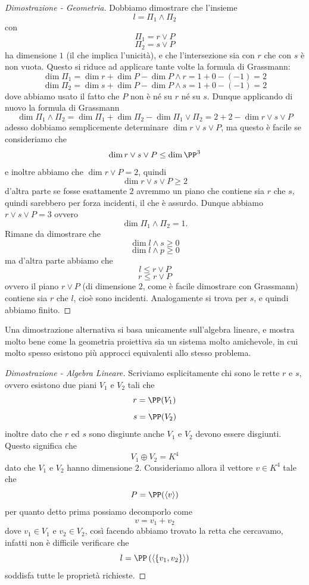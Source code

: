\documentclass[11pt]{scrartcl}
\begin{document}
   	 \begin{proof}[Dimostrazione - Geometria]
   	 	Dobbiamo dimostrare che l'insieme
   	 	$$l=\Pi_1\land \Pi_2$$
   	 	con 
   	 	$$\Pi_1=r\lor P$$
   	 	$$\Pi_2=s\lor P$$
   	 	ha dimensione $1$ (il che implica l'unicità), e che l'intersezione sia con $r$ che con $s$ è non vuota. Questo si riduce ad applicare tante volte la formula di Grassmann:
   	 	$$\dim \Pi_1=\dim r + \dim P - \dim P\land r=1+0-(-1)=2$$
   	 	$$\dim \Pi_2=\dim s + \dim P - \dim P\land s=1+0-(-1)=2$$
   	 	dove abbiamo usato il fatto che $P$ non è né su $r$ né su $s$. Dunque applicando di nuovo la formula di Grassmann
   	 	$$\dim \Pi_1\land \Pi_2=\dim \Pi_1+\dim \Pi_2-\dim \Pi_1\lor \Pi_2=2+2-\dim r\lor s\lor P$$
   	 	adesso dobbiamo semplicemente determinare $\dim r\lor s \lor P$, ma questo è facile se consideriamo che
   	 	$$\dim r\lor s \lor P \le \dim \PP^3$$
   	 	e inoltre abbiamo che $\dim r \lor P=2$, quindi 
   	 	$$\dim r \lor s \lor P\ge 2$$
   	 	d'altra parte se fosse esattamente $2$ avremmo un piano che contiene sia $r$ che $s$, quindi sarebbero per forza incidenti, il che è assurdo. Dunque abbiamo $r\lor s\lor P=3$ ovvero
   	 	$$\dim \Pi_1\land \Pi_2=1.$$
   	 	Rimane da dimostrare che 
   	 	$$\dim l \land s\ge 0$$
   	 	$$\dim l \land p\ge 0$$
   	 	ma d'altra parte abbiamo che
   	 	$$l\le r\lor P$$
   	 	$$r\le r\lor P$$
   	 	ovvero il piano $r\lor P$ (di dimensione $2$, come è facile dimostrare con Grassmann) contiene sia $r$ che $l$, cioè sono incidenti. Analogamente si trova per $s$, e quindi abbiamo finito.
   	 \end{proof}
   	 Una dimostrazione alternativa si basa unicamente sull'algebra lineare, e mostra molto bene come la geometria proiettiva sia un sistema molto amichevole, in cui molto spesso esistono più approcci equivalenti allo stesso problema.
   	 \begin{proof}[Dimostrazione - Algebra Lineare]
   	 	Scriviamo esplicitamente chi sono le rette $r$ e $s$, ovvero esistono due piani $V_1$ e $V_2$ tali che
   	 	$$r=\PP(V_1)$$
   	 	$$s=\PP(V_2)$$
   	 	inoltre dato che $r$ ed $s$ sono disgiunte anche $V_1$ e $V_2$ devono essere disgiunti. Questo significa che 
   	 	$$V_1\oplus V_2 = K^4$$
   	 	dato che $V_1$ e $V_2$ hanno dimensione $2$. Consideriamo allora il vettore $v\in K^4$ tale che
   	 	$$P=\PP(\langle v \rangle)$$
   	 	per quanto detto prima possiamo decomporlo come
   	 	$$v=v_1+v_2$$
   	 	dove $v_1\in V_1$ e $v_2\in V_2$, così facendo abbiamo trovato la retta che cercavamo, infatti non è difficile verificare che 
   	 	$$l=\PP\left(\langle\left\{v_1,v_2\right\}\rangle\right)$$
   	 	soddisfa tutte le proprietà richieste.
   	 \end{proof}
\end{document}
